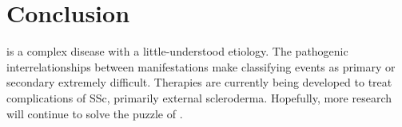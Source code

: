 \section{Conclusion}

\SSc is a complex disease with a little-understood etiology. The pathogenic
interrelationships between manifestations make classifying events as primary
or secondary extremely difficult. Therapies are currently being developed to
treat complications of SSc, primarily external scleroderma. Hopefully, more
research will continue to solve the puzzle of \ssc.

